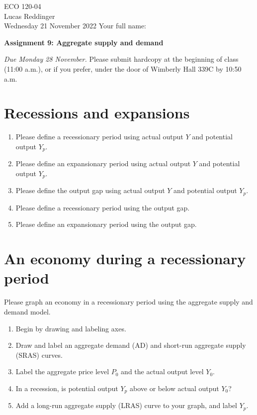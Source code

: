 \documentclass[
    letterpaper,paper=portrait,fleqn,
    DIV=16,fontsize=12pt,twoside=semi,
    parskip=full-,
    headings=standardclasses]
{scrartcl}
\begin{document}
\RaggedRight
\thispagestyle{plain}

ECO 120-04 \\
Lucas Reddinger \\
Wednesday 21 November 2022 \hfill Your full name: \underline{\hspace{3.25in}}

\vspace{0.7\baselineskip}
\textbf{\LARGE Assignment 9: Aggregate supply and demand}
\vspace{0.3\baselineskip}

\emph{Due Monday 28 November.} Please submit hardcopy at the beginning of class (11:00 a.m.), or if you prefer, under the door of Wimberly Hall 339C by 10:50 a.m.

\section{Recessions and expansions}

\begin{enumerate}[font={\bfseries}]
\item Please define a recessionary period using actual output $Y$ and potential output $Y_p$.
\vfill
\item Please define an expansionary period using actual output $Y$ and potential output $Y_p$.
\vfill
\item Please define the output gap using actual output $Y$ and potential output $Y_p$.
\vfill
\item Please define a recessionary period using the output gap.
\vfill
\item Please define an expansionary period using the output gap.
\vfill
\end{enumerate}

\vspace{-2\baselineskip}
\clearpage

\section{An economy during a recessionary period\label{sec:recession}}

Please graph an economy in a recessionary period using the aggregate supply and demand model.

\begin{enumerate}[font={\bfseries}]
\item Begin by drawing and labeling axes.
\item Draw and label an aggregate demand (AD) and short-run aggregate supply (SRAS) curves.
\item Label the aggregate price level $P_0$ and the actual output level $Y_0$.
\item In a recession, is potential output $Y_p$ above or below actual output $Y_0$? \hfill \underline{\hspace{1.5in}}
\item Add a long-run aggregate supply (LRAS) curve to your graph, and label $Y_p$.
\end{enumerate}
\end{document}
